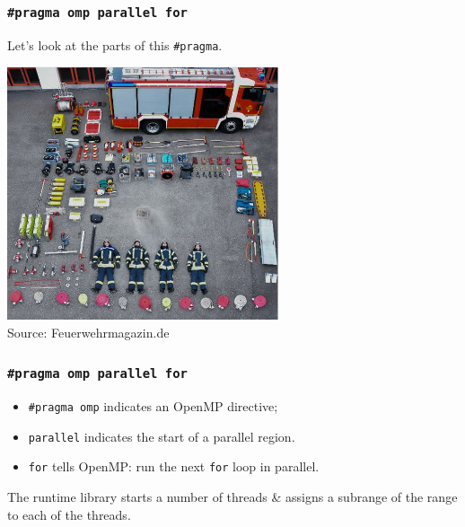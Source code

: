 \begin{frame}[containsverbatim]
  \frametitle{{\tt \#pragma omp parallel for}}

  Let's look at the parts of this \verb+#pragma+.\\[1em]
  
  \begin{center}
	\includegraphics[width=0.6\textwidth]{images/Feuerwehr-Tetris.jpg}\\
	\hfill Source: Feuerwehrmagazin.de
 \end{center}

\end{frame}

\begin{frame}[containsverbatim]
  \frametitle{{\tt \#pragma omp parallel for}}
  \begin{itemize}
    \item \verb+#pragma omp+ indicates an OpenMP directive;
    \vfill
    \item {\tt parallel} indicates the start of a parallel region.
    \vfill
    \item {\tt for} tells OpenMP: run the next {\tt for} loop in parallel.
  \end{itemize}


The runtime library starts
  a number of threads \&  assigns a subrange of the range to 
  each of the threads.


\end{frame}

